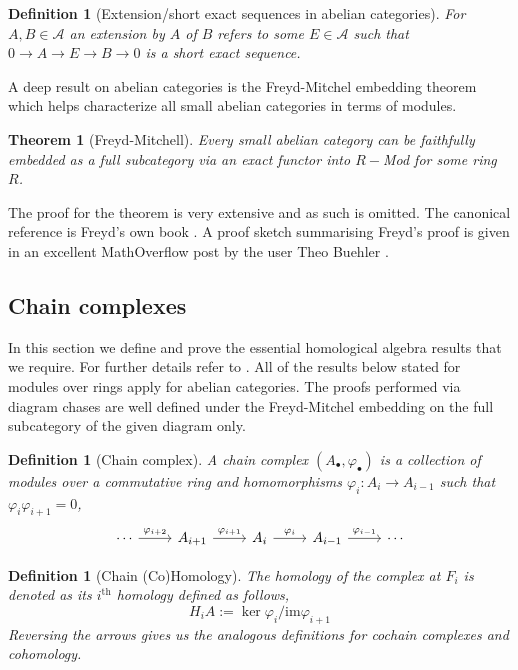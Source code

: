 \documentclass[12pt]{article}
\numberwithin{equation}{section}
\newcounter{dummy} \numberwithin{dummy}{section}
\newtheorem{theorem}[dummy]{Theorem}
\newtheorem{definition}[dummy]{Definition}
\begin{document}
	\begin{definition}[Extension/short exact sequences in abelian categories]
		For $ A, B \in \mathcal{A}$ an extension by $A$ of $B$ refers to some $E \in \mathcal{A}$ such that $0 \to A \to E \to B \to 0$ is a short exact sequence.
	\end{definition}
	


	
	A deep result on abelian categories is the Freyd-Mitchel embedding theorem which helps characterize all small abelian categories in terms of modules.
	
	\begin{theorem}[Freyd-Mitchell]
		Every small abelian category can be faithfully embedded as a full subcategory via an exact functor into $R-$Mod for some ring $R$.
	\end{theorem}
	The proof for the theorem is very extensive and as such is omitted. The canonical reference is Freyd's own book \cite{freyd1964abelian}. A proof sketch summarising Freyd's proof is given in an excellent MathOverflow post by the user Theo Buehler \cite{47762}.
	
	\subsection{Chain complexes}
	In this section we define and prove the essential homological algebra results that we require. For further details refer to \cite{eisenbud2013commutative, weibel_1994}. All of the results below stated for modules over rings apply for abelian categories. The proofs performed via diagram chases are well defined under the Freyd-Mitchel embedding on the full subcategory of the given diagram only.
	
	\begin{definition}[Chain complex]
		A {chain complex} $(A_\bullet, \varphi_\bullet)$ is a collection of modules over a commutative ring and homomorphisms $\varphi_i: A_i \to A_{i-1}$ such that $\varphi_i \varphi_{i+1}=0$,
		\[\begin{tikzcd}
			\cdots & {A_{i+1}} & {A_i} & {A_{i-1}} & \cdots
			\arrow["{\varphi_{i+1}}", from=1-2, to=1-3]
			\arrow["{\varphi_i}", from=1-3, to=1-4]
			\arrow["{\varphi_{i-1}}", from=1-4, to=1-5]
			\arrow["{\varphi_{i+2}}", from=1-1, to=1-2]
		\end{tikzcd}\]
	\end{definition}
	\begin{definition}[Chain (Co)Homology]
		The {homology} of the complex at $F_i$ is denoted as its $i^{\mathrm{th}}$ homology defined as follows,
		\[ H_iA := \ker \varphi_i/ \mathrm{im} \varphi_{i+1} \]
		Reversing the arrows gives us the analogous definitions for cochain complexes and cohomology.
	\end{definition}
	
\end{document}
